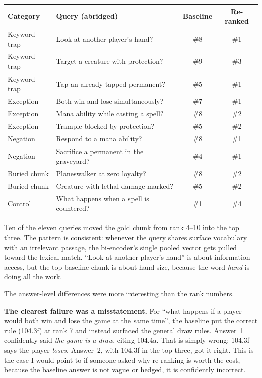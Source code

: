 \documentclass[11pt,a4paper]{article}
\begin{document}
\begin{center}
\small
\begin{tabular}{@{}llcc@{}}
\toprule
\textbf{Category} & \textbf{Query (abridged)} & \textbf{Baseline} & \textbf{Re-ranked} \\
\midrule
Keyword trap   & Look at another player's hand?              & \#8 & \#1 \\
Keyword trap   & Target a creature with protection?          & \#9 & \#3 \\
Keyword trap   & Tap an already-tapped permanent?            & \#5 & \#1 \\
Exception      & Both win and lose simultaneously?           & \#7 & \#1 \\
Exception      & Mana ability while casting a spell?         & \#8 & \#2 \\
Exception      & Trample blocked by protection?              & \#5 & \#2 \\
Negation       & Respond to a mana ability?                  & \#8 & \#1 \\
Negation       & Sacrifice a permanent in the graveyard?     & \#4 & \#1 \\
Buried chunk   & Planeswalker at zero loyalty?               & \#8 & \#2 \\
Buried chunk   & Creature with lethal damage marked?         & \#5 & \#2 \\
\midrule
Control        & What happens when a spell is countered?     & \#1 & \#4 \\
\bottomrule
\end{tabular}
\end{center}

Ten of the eleven queries moved the gold chunk from rank 4--10 into the top three. The pattern
is consistent: whenever the query shares surface vocabulary with an irrelevant passage, the
bi-encoder's single pooled vector gets pulled toward the lexical match. ``Look at another
player's hand'' is about information access, but the top baseline chunk is about hand size,
because the word \emph{hand} is doing all the work.

The answer-level differences were more interesting than the rank numbers.

\textbf{The clearest failure was a misstatement.} For ``what happens if a player would both win
and lose the game at the same time'', the baseline put the correct rule (104.3f) at rank 7 and
instead surfaced the general draw rules. Answer~1 confidently said \emph{the game is a draw},
citing 104.4a. That is simply wrong: 104.3f says the player \emph{loses}. Answer~2, with 104.3f
in the top three, got it right. This is the case I would point to if someone asked why
re-ranking is worth the cost, because the baseline answer is not vague or hedged, it is
confidently incorrect.
\end{document}
